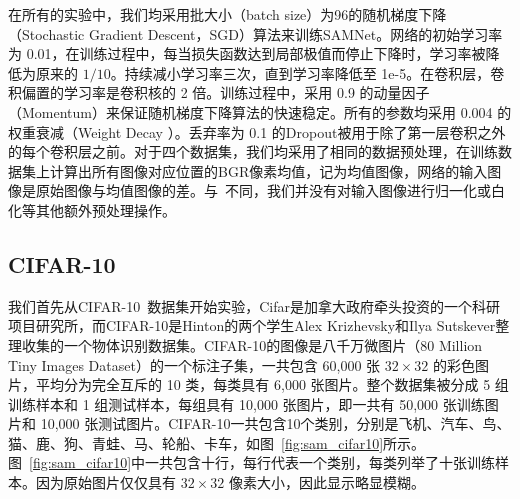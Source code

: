 在所有的实验中，我们均采用批大小（batch size）为96的随机梯度下降（Stochastic Gradient Descent，SGD）算法来训练SAMNet。网络的初始学习率为 0.01，在训练过程中，每当损失函数达到局部极值而停止下降时，学习率被降低为原来的 $1/10$。持续减小学习率三次，直到学习率降低至 1e-5。在卷积层，卷积偏置的学习率是卷积核的 2 倍。训练过程中，采用 0.9 的动量因子（Momentum）来保证随机梯度下降算法的快速稳定。所有的参数均采用 0.004 的权重衰减（Weight Decay ）。丢弃率为 0.1 的Dropout被用于除了第一层卷积之外的每个卷积层之前。对于四个数据集，我们均采用了相同的数据预处理，在训练数据集上计算出所有图像对应位置的BGR像素均值，记为均值图像，网络的输入图像是原始图像与均值图像的差。与~\cite{goodfellow2013maxout}不同，我们并没有对输入图像进行归一化或白化等其他额外预处理操作。

\subsection{CIFAR-10}
\label{sec:sap:experiment:cifar10}

我们首先从CIFAR-10~\cite{krizhevsky2009learning}数据集开始实验，Cifar是加拿大政府牵头投资的一个科研项目研究所，而CIFAR-10是Hinton的两个学生Alex Krizhevsky和Ilya Sutskever整理收集的一个物体识别数据集。CIFAR-10的图像是八千万微图片（80 Million Tiny Images Dataset）的一个标注子集，一共包含 60,000 张 $32\times32$ 的彩色图片，平均分为完全互斥的 10 类，每类具有 6,000 张图片。整个数据集被分成 5 组训练样本和 1 组测试样本，每组具有 10,000 张图片，即一共有 50,000 张训练图片和 10,000 张测试图片。CIFAR-10一共包含10个类别，分别是飞机、汽车、鸟、猫、鹿、狗、青蛙、马、轮船、卡车，如图~\ref{fig:sam_cifar10}所示。图~\ref{fig:sam_cifar10}中一共包含十行，每行代表一个类别，每类列举了十张训练样本。因为原始图片仅仅具有 $32\times32$ 像素大小，因此显示略显模糊。

